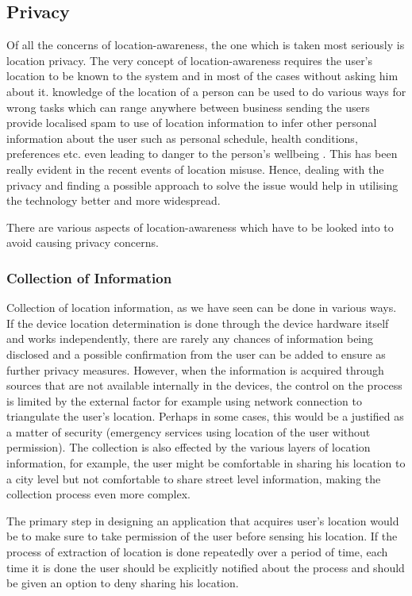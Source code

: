 \documentclass[12pt]{report}
\begin{document}
\subsection{Privacy}
Of all the concerns of location-awareness, the one which is taken most seriously is location privacy. The very concept of location-awareness requires the user's location to be known to the system and in most of the cases without asking him about it. knowledge of the location of a person can be used to do various ways for wrong tasks which can range anywhere between business sending the users provide localised spam to use of location information to infer other personal information about the user such as personal schedule, health conditions, preferences etc. even leading to danger to the person's wellbeing \cite{duckham2006location}. This has been really evident in the recent events of location misuse. Hence, dealing with the privacy and finding a possible approach to solve the issue would help in utilising the technology better and more widespread. 

There are various aspects of location-awareness which have to be looked into to avoid causing privacy concerns.
\subsubsection{Collection of Information}


Collection of location information, as we have seen can be done in various ways. If the device location determination is done through the device hardware itself and works independently, there are rarely any chances of information being disclosed and a possible confirmation from the user can be added to ensure as further privacy measures. However, when the information is acquired through sources that are not available internally in the devices, the control on the process is limited by the external factor for example using network connection to triangulate the user's location. Perhaps in some cases, this would be a justified as a matter of security (emergency services using location of the user without permission).  The collection is also effected by the various layers of location information, for example, the user might be comfortable in sharing his location to a city level but not comfortable to share street level information, making the collection process even more complex.


The primary step in designing an application that acquires user's location would be to make sure to take permission of the user before sensing his location. If the process of extraction of location is done repeatedly over a period of time, each time it is done the user should be explicitly notified about the process and should be given an option to deny sharing his location.
\end{document}
